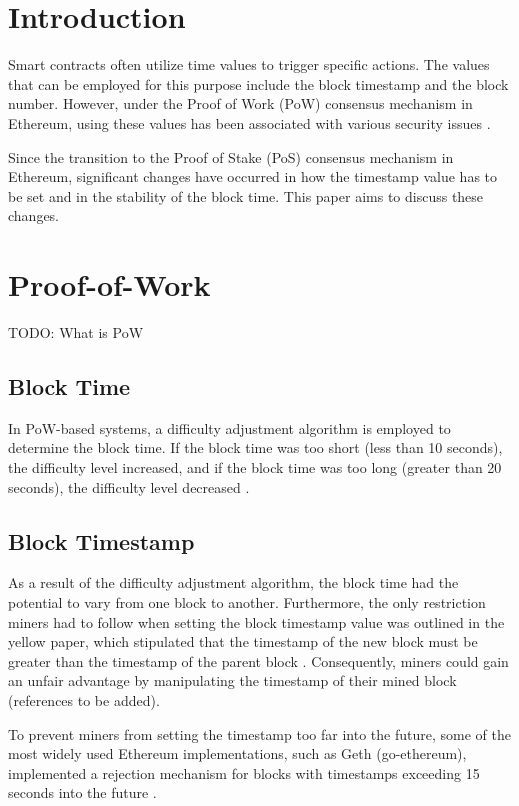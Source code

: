 \section{Introduction}

Smart contracts often utilize time values to trigger specific actions. The
values that can be employed for this purpose include the block timestamp and
the block number. However, under the Proof of Work (PoW) consensus mechanism in
Ethereum, using these values has been associated with various security issues
\cite{swc116} \cite{Conkas2021} \cite{DASP2018} \cite{Osiris2018}
\cite{Oyente2016}.


Since the transition to the Proof of Stake (PoS) consensus mechanism in
Ethereum, significant changes have occurred in how the timestamp value has to
be set and in the stability of the block time. This paper aims to discuss these
changes.

\section{Proof-of-Work}
TODO: What is PoW

\subsection{Block Time}

In PoW-based systems, a difficulty adjustment algorithm is employed to
determine the block time. If the block time was too short (less than 10
seconds), the difficulty level increased, and if the block time was too long
(greater than 20 seconds), the difficulty level decreased \cite{eip-2}.

\subsection{Block Timestamp}

As a result of the difficulty adjustment algorithm, the block time had the
potential to vary from one block to another. Furthermore, the only restriction
miners had to follow when setting the block timestamp value was outlined in the
yellow paper, which stipulated that the timestamp of the new block must be
greater than the timestamp of the parent block \cite{ethyellowpaper2023}.
Consequently, miners could gain an unfair advantage by manipulating the
timestamp of their mined block (references to be added).


To prevent miners from setting the timestamp too far into the future, some of the most widely used Ethereum implementations, such as Geth (go-ethereum), implemented a rejection mechanism for blocks with timestamps exceeding 15 seconds into the future \cite{go-ethereum-15-sek-limit}.

